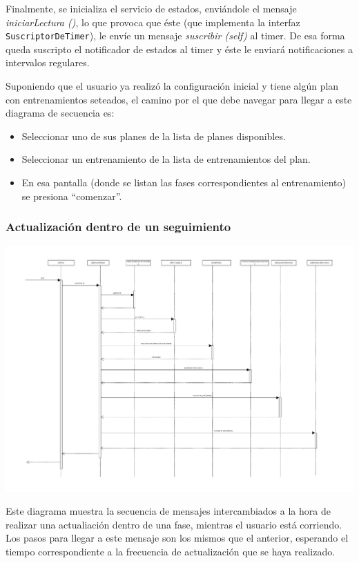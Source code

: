 Finalmente, se inicializa el servicio de estados, enviándole el mensaje \emph{iniciarLectura ()}, lo que provoca que éste (que implementa la interfaz \texttt{SuscriptorDeTimer}), le envíe un mensaje \emph{suscribir (self)} al timer. De esa forma queda suscripto el notificador de estados al timer y éste le enviará notificaciones a intervalos regulares.


Suponiendo que el usuario ya realizó la configuración inicial y tiene algún plan con entrenamientos seteados, el camino por el que debe navegar para llegar a este diagrama de secuencia es:
\begin{itemize}
	\item Seleccionar uno de sus planes de la lista de planes disponibles.
	\item Seleccionar un entrenamiento de la lista de entrenamientos del plan.
	\item En esa pantalla (donde se listan las fases correspondientes al entrenamiento) se presiona ``comenzar''.
\end{itemize}

\subsubsection{Actualización dentro de un seguimiento} \label{unaSeccion}
\begin{center}
	\includegraphics[scale=0.5]{images/actualizacionSeguimiento.pdf}
\end{center}

Este diagrama muestra la secuencia de mensajes intercambiados a la hora de realizar una actualiación dentro de una fase, mientras el usuario está corriendo. Los pasos para llegar a este mensaje son los mismos que el anterior, esperando el tiempo correspondiente a la frecuencia de actualización que se haya realizado.


